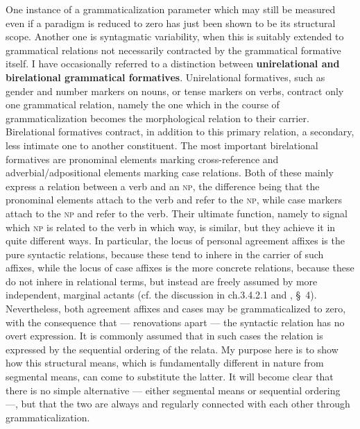 One instance of a grammaticalization parameter which may still be measured even if a paradigm is reduced to zero has just been shown to be its structural scope. Another one is syntagmatic variability, when this is suitably extended to grammatical relations not necessarily contracted by the grammatical formative itself. I have occasionally referred to a distinction between \textbf{unirelational and birelational grammatical formatives}. Unirelational formatives, such as gender and number markers on nouns, or tense markers on verbs, contract only one grammatical relation, namely the one which in the course of grammaticalization becomes the morphological relation to their carrier. Birelational formatives contract, in addition to this primary relation, a secondary, less intimate one to another constituent. The most important birelational formatives are pronominal elements marking cross-reference and adverbial/adpositional elements marking case relations. Both of these mainly express a relation between a verb and an \textsc{np}, the difference being that the pronominal elements attach to the verb and refer to the \textsc{np}, while case markers attach to the \textsc{np} and refer to the verb. Their ultimate function, namely to signal which \textsc{np} is related to the verb in which way, is similar, but they achieve it in quite different ways. In particular, the locus of personal agreement affixes is the pure syntactic relations, because these tend to inhere in the carrier of such affixes, while the locus of case affixes is the more concrete relations, because these do not inhere in relational terms, but instead are freely assumed by more independent, marginal actants (cf. the discussion in ch.3.4.2.1 and \citet{Lehmann1983}, §~4). Nevertheless, both agreement affixes and cases may be grammaticalized to zero, with the consequence that — renovations apart — the syntactic relation has no overt expression. It is commonly assumed that in such cases the relation is expressed by the sequential ordering of the relata. My purpose here is to show how this structural means, which is fundamentally different in nature from segmental means, can come to substitute the latter. It will become clear that there is no simple alternative — either segmental means or sequential ordering —, but that the two are always and regularly connected with each other through grammaticalization.

